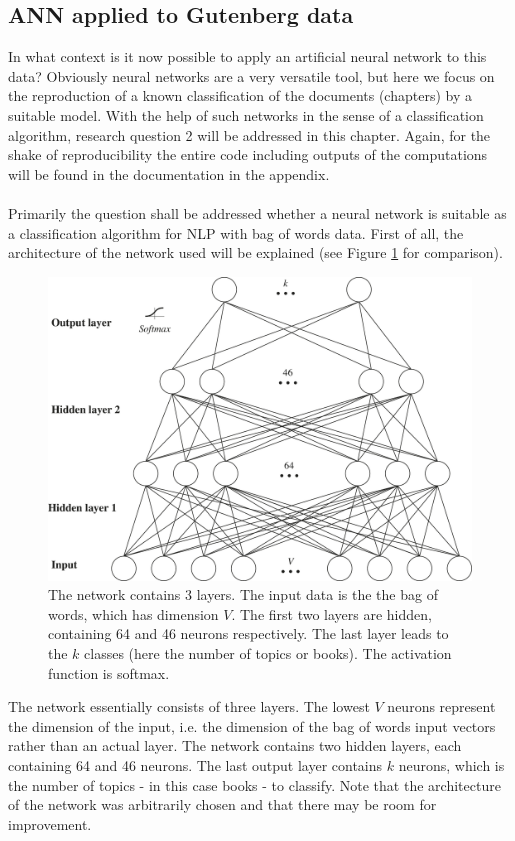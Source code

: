 \documentclass[11pt,a4paper]{article}
\begin{document}
\subsection{ANN applied to Gutenberg data}

In what context is it now possible to apply an artificial neural network to this data? Obviously neural networks are a very versatile tool, but here we focus on the reproduction of a known classification of the documents (chapters) by a suitable model. With the help of such networks in the sense of a classification algorithm, research question 2 will be addressed in this chapter. Again, for the shake of reproducibility the entire code including outputs of the computations will be found in the documentation in the appendix.\\
\ \\
Primarily the question shall be addressed whether a neural network is suitable as a classification algorithm for NLP with bag of words data. First of all, the architecture of the network used will be explained (see Figure \ref{fig:network_structure} for comparison).
\begin{figure}[h]
	\centering\includegraphics[width=1\textwidth]{network_structure.pdf}
	\caption{The network contains 3 layers. The input data is the the bag of words, which has dimension $V$. The first two layers are hidden, containing 64 and 46 neurons respectively. The last layer leads to the $k$ classes (here the number of topics or books). The activation function is softmax.}
	\label{fig:network_structure}
\end{figure}
The network essentially consists of three layers. The lowest $V$ neurons represent the dimension of the input, i.e. the dimension of the bag of words input vectors rather than an actual layer. The network contains two hidden layers, each containing 64 and 46 neurons. The last output layer contains $k$ neurons, which is the number of topics - in this case books - to classify. Note that the architecture of the network was arbitrarily chosen and that there may be room for improvement.\\
\end{document}
